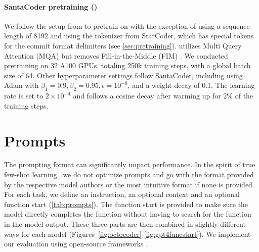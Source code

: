 \paragraph{SantaCoder pretraining (\modelsc{})} We follow the setup from \citet{allal2023santacoder} to pretrain on \data{} with the exception of using a sequence length of 8192 and using the tokenizer from StarCoder, which has special tokens for the commit format delimiters (see \autoref{sec:pretraining}). \modelsc{} utilizes Multi Query Attention (MQA) \citep{shazeer2019mqa} but removes Fill-in-the-Middle (FIM) \citep{bavarian2022fim}. We conducted pretraining on 32 A100 GPUs, totaling 250k training steps, with a global batch size of 64. Other hyperparameter settings follow SantaCoder, including using Adam with $\beta_1=0.9, \beta_2=0.95, \epsilon=10^{-8}$, and a weight decay of 0.1. The learning rate is set to $2 \times 10^{-4}$ and follows a cosine decay after warming up for 2\% of the training steps. 



\section{Prompts}
\label{sec:prompts}


The prompting format can significantly impact performance. In the spirit of true few-shot learning~\citep{perez2021true} we do not optimize prompts and go with the format provided by the respective model authors or the most intuitive format if none is provided. For each task, we define an instruction, an optional context and an optional function start (\autoref{tab:prompts}). The function start is provided to make sure the model directly completes the function without having to search for the function in the model output. These three parts are then combined in slightly different ways for each model (Figures~\ref{fig:octocoder}-\ref{fig:gpt4funcstart}). We implement our evaluation using open-source frameworks~\citep{bigcode-evaluation-harness,eval-harness}.


